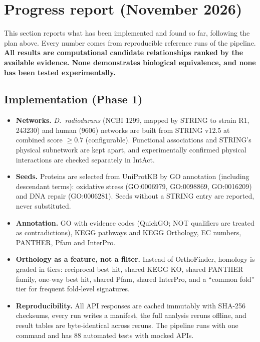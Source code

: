 \clearpage
\section{Progress report (November 2026)}

This section reports what has been implemented and found so far, following the plan above.
Every number comes from reproducible reference runs of the pipeline. \textbf{All results are
computational candidate relationships ranked by the available evidence. None demonstrates
biological equivalence, and none has been tested experimentally.}

\subsection{Implementation (Phase 1)}

\begin{itemize}
  \item \textbf{Networks.} \emph{D.~radiodurans} (NCBI 1299, mapped by STRING to strain R1,
    243230) and human (9606) networks are built from STRING v12.5 at combined score
    $\geq 0.7$ (configurable). Functional associations and STRING's physical subnetwork are
    kept apart, and experimentally confirmed physical interactions are checked separately
    in IntAct.
  \item \textbf{Seeds.} Proteins are selected from UniProtKB by GO annotation (including
    descendant terms): oxidative stress (GO:0006979, GO:0098869, GO:0016209) and DNA repair
    (GO:0006281). Seeds without a STRING entry are reported, never substituted.
  \item \textbf{Annotation.} GO with evidence codes (QuickGO; NOT qualifiers are treated as
    contradictions), KEGG pathways and KEGG Orthology, EC numbers, PANTHER, Pfam and InterPro.
  \item \textbf{Orthology as a feature, not a filter.} Instead of OrthoFinder, homology is graded
    in tiers: reciprocal best hit, shared KEGG KO, shared PANTHER family, one-way best hit,
    shared Pfam, shared InterPro, and a ``common fold'' tier for frequent fold-level signatures.
  \item \textbf{Reproducibility.} All API responses are cached immutably with SHA-256
    checksums, every run writes a manifest, the full analysis reruns offline, and result tables
    are byte-identical across reruns. The pipeline runs with one command and has 88 automated
    tests with mocked APIs.
\end{itemize}


